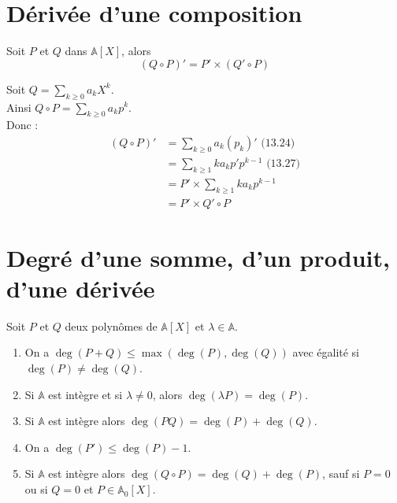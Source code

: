 \documentclass[../main.tex]{subfiles}
\begin{document}
\setcounter{section}{27}
\section{Dérivée d'une composition}

\begin{tcolorbox}[title=Propostion 13.28, title filled=false, colframe=lightblue, colback=lightblue!10!white]
    Soit $P$ et $Q$ dans $\mathbb{A}[X]$, alors 
    $$(Q \circ P)' = P' \times (Q' \circ P)$$
\end{tcolorbox}

Soit $Q = \sum\limits_{k \geq 0} a_k X^k$. \\
Ainsi $Q \circ P = \sum\limits_{k \geq 0} a_k p^k$. \\
Donc : 
\begin{align*}
    (Q \circ P)' &= \sum_{k \geq 0} a_k (p_k)' \text{ (13.24)} \\
    &= \sum_{k \geq 1} k a_k p' p^{k-1} \text{ (13.27)} \\
    &= P' \times \sum_{k \geq 1} k a_k p^{k-1} \\
    &= P' \times Q' \circ P
\end{align*}

\setcounter{section}{33}
\section{Degré d'une somme, d'un produit, d'une dérivée}

\begin{tcolorbox}[title=Propostion 13.34, title filled=false, colframe=lightblue, colback=lightblue!10!white]
    Soit $P$ et $Q$ deux polynômes de $\mathbb{A}[X]$ et $\lambda \in \mathbb{A}$. 
    \begin{enumerate}
        \item On a $\deg(P + Q) \leq \max(\deg(P), \deg(Q))$ avec égalité si $\deg(P) \neq \deg(Q)$. 
        \item Si $\mathbb{A}$ est intègre et si $\lambda \neq 0$, alors $\deg(\lambda P) = \deg(P)$. 
        \item Si $\mathbb{A}$ est intègre alors $\deg(PQ) = \deg(P) + \deg(Q)$. 
        \item On a $\deg(P') \leq \deg(P) - 1$. 
        \item Si $\mathbb{A}$ est intègre alors $\deg(Q \circ P) = \deg(Q) + \deg(P)$, sauf si $P = 0$ ou si $Q = 0$ et $P \in \mathbb{A}_0[X]$. 
    \end{enumerate}
\end{tcolorbox}
\end{document}
